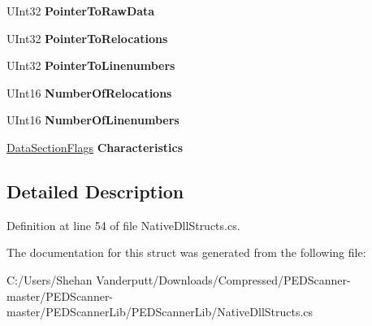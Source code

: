 \begin{DoxyCompactItemize}
U\+Int32 {\bfseries Pointer\+To\+Raw\+Data}
\item 
\mbox{\label{struct_p_e_d_scanner_lib_1_1_struct_1_1_i_m_a_g_e___s_e_c_t_i_o_n___h_e_a_d_e_r_afaabbcd75d808f82ed6e673af1562f20}} 
U\+Int32 {\bfseries Pointer\+To\+Relocations}
\item 
\mbox{\label{struct_p_e_d_scanner_lib_1_1_struct_1_1_i_m_a_g_e___s_e_c_t_i_o_n___h_e_a_d_e_r_a6cb0e9102a30b0ee633f2d9ce9d2645c}} 
U\+Int32 {\bfseries Pointer\+To\+Linenumbers}
\item 
\mbox{\label{struct_p_e_d_scanner_lib_1_1_struct_1_1_i_m_a_g_e___s_e_c_t_i_o_n___h_e_a_d_e_r_a8f0c306ed7c95baf7ae3962dff42d159}} 
U\+Int16 {\bfseries Number\+Of\+Relocations}
\item 
\mbox{\label{struct_p_e_d_scanner_lib_1_1_struct_1_1_i_m_a_g_e___s_e_c_t_i_o_n___h_e_a_d_e_r_a861546a42dff2555e16572ffb2eb07b1}} 
U\+Int16 {\bfseries Number\+Of\+Linenumbers}
\item 
\mbox{\label{struct_p_e_d_scanner_lib_1_1_struct_1_1_i_m_a_g_e___s_e_c_t_i_o_n___h_e_a_d_e_r_acf92f9133790b17d8a6c08d49f7571e1}} 
\mbox{\hyperlink{namespace_p_e_d_scanner_lib_1_1_struct_adcfcad03660af9e999d7400ea09db6bc}{Data\+Section\+Flags}} {\bfseries Characteristics}
\end{DoxyCompactItemize}


\subsection{Detailed Description}


Definition at line 54 of file Native\+Dll\+Structs.\+cs.



The documentation for this struct was generated from the following file\+:\begin{DoxyCompactItemize}
\item 
C\+:/\+Users/\+Shehan Vanderputt/\+Downloads/\+Compressed/\+P\+E\+D\+Scanner-\/master/\+P\+E\+D\+Scanner-\/master/\+P\+E\+D\+Scanner\+Lib/\+P\+E\+D\+Scanner\+Lib/Native\+Dll\+Structs.\+cs\end{DoxyCompactItemize}
